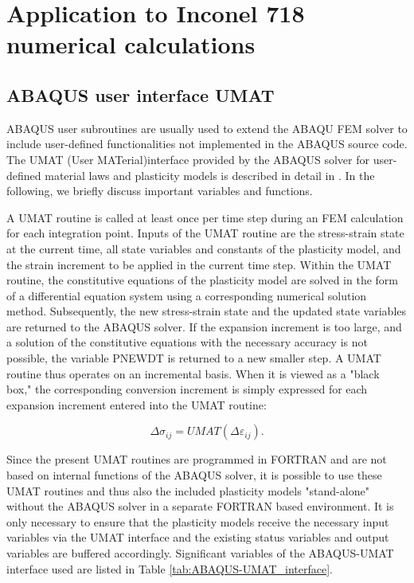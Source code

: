\section{Application to Inconel 718 numerical calculations}

\subsection{ABAQUS user interface UMAT}
ABAQUS user subroutines are usually used to extend the ABAQU FEM solver to include user-defined functionalities not implemented in the ABAQUS source code.
The UMAT (User MATerial)interface provided by the ABAQUS solver for user-defined material laws and plasticity models is described in detail in \cite{abaqus20106}. In the following, we briefly discuss important variables and functions.

A UMAT routine is called at least once per time step during an FEM calculation for each integration point.
Inputs of the UMAT routine are the stress-strain state at the current time, all state variables and constants of the plasticity model, and the strain increment to be applied in the current time step.
Within the UMAT routine, the constitutive equations of the plasticity model are solved in the form of a differential equation system using a corresponding numerical solution method.
Subsequently, the new stress-strain state and the updated state variables are returned to the ABAQUS solver.
If the expansion increment is too large, and a solution of the constitutive equations with the necessary accuracy is not possible, the variable PNEWDT is returned to a new smaller step.
A UMAT routine thus operates on an incremental basis.
When it is viewed as a "black box," the corresponding conversion increment is simply expressed for each expansion increment entered into the UMAT routine:

\begin{equation}
\Delta \sigma_{ij}=UMAT(\Delta \varepsilon_{ij}).
\end{equation}

Since the present UMAT routines are programmed in FORTRAN and are not based on internal functions of the ABAQUS solver, it is possible to use these UMAT routines and thus also the included plasticity models "stand-alone" without the ABAQUS solver in a separate FORTRAN based environment.
It is only necessary to ensure that the plasticity models receive the necessary input variables via the UMAT interface and the existing status variables and output variables are buffered accordingly.
Significant variables of the ABAQUS-UMAT interface used are listed in Table \ref{tab:ABAQUS-UMAT_interface}.

